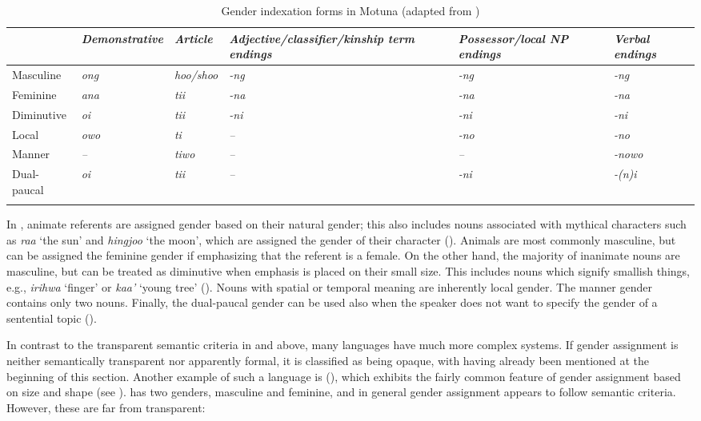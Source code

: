\documentclass[output=collectionpaper]{langsci/langscibook}
\begin{document}

\begin{table}
\small
\begin{tabularx}{\textwidth}{X>{\itshape}X>{\itshape}X>{\itshape}X>{\itshape}X>{\itshape}X}
\lsptoprule
& \normalfont Demon\-strative & \normalfont Article  & \normalfont Adjective/\newline classifier/\newline kinship term endings & \normalfont Possessor/\newline local NP endings  &  \normalfont Verbal endings \\
\midrule
Masculine &  ong & hoo/shoo  & -ng  & -ng  & -ng \\
Feminine & ana  & tii  & -na  & -na  & -na \\
Diminutive & oi  & tii  & -ni  & -ni  & -ni \\
Local & owo  & ti  & --  & -no  & -no \\
Manner & --  & tiwo  & --  & --  & -nowo \\
Dual-paucal & oi & tii & -- & -ni & -(n)i \\
\lspbottomrule
\end{tabularx}
\caption{Gender indexation forms in Motuna (adapted from \citealt[70]{Onishi1994})}
\label{tab:Svard:6}
\end{table}

In , animate referents are assigned gender based on their natural gender; this also includes nouns associated with mythical characters such as \textit{raa} `the sun' and \textit{hingjoo} `the moon', which are assigned the gender of their character (\citealt[70]{Onishi1994}). Animals are most commonly masculine, but can be assigned the feminine gender if emphasizing that the referent is a female. On the other hand, the majority of inanimate nouns are masculine, but can be treated as diminutive when emphasis is placed on their small size. This includes nouns which signify smallish things, e.g., \textit{irihwa} `finger' or \textit{kaa'} `young tree' (\citealt[71]{Onishi1994}). Nouns with spatial or temporal meaning are inherently local gender. The manner gender contains only two nouns. Finally, the dual-paucal gender can be used also when the speaker does not want to specify the gender of a sentential topic (\citealt[71]{Onishi1994}).

In contrast to the transparent semantic criteria in  and  above, many languages have much more complex systems. If gender assignment is neither semantically transparent nor apparently formal, it is classified as being opaque, with  having already been mentioned at the beginning of this section. Another example of such a language is  (), which exhibits the fairly common feature of gender assignment based on size and shape (see ).  has two genders, masculine and feminine, and in general gender assignment appears to follow semantic criteria. However, these are far from transparent:
\end{document}

